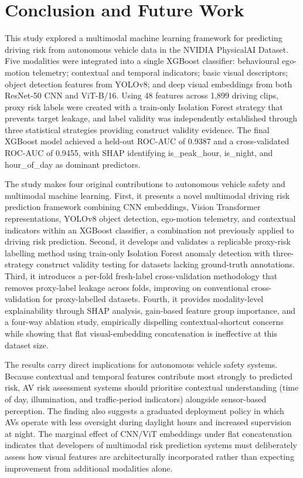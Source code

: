 \documentclass[11pt,a4paper]{article}
\begin{document}
\section{Conclusion and Future Work}

This study explored a multimodal machine learning framework for predicting driving risk from autonomous vehicle data in the NVIDIA PhysicalAI Dataset. Five modalities were integrated into a single XGBoost classifier: behavioural ego-motion telemetry; contextual and temporal indicators; basic visual descriptors; object detection features from YOLOv8; and deep visual embeddings from both ResNet-50 CNN and ViT-B/16. Using 48 features across 1,899 driving clips, proxy risk labels were created with a train-only Isolation Forest strategy that prevents target leakage, and label validity was independently established through three statistical strategies providing construct validity evidence. The final XGBoost model achieved a held-out ROC-AUC of 0.9387 and a cross-validated ROC-AUC of 0.9455, with SHAP identifying is\_peak\_hour, is\_night, and hour\_of\_day as dominant predictors.

The study makes four original contributions to autonomous vehicle safety and multimodal machine learning. First, it presents a novel multimodal driving risk prediction framework combining CNN embeddings, Vision Transformer representations, YOLOv8 object detection, ego-motion telemetry, and contextual indicators within an XGBoost classifier, a combination not previously applied to driving risk prediction. Second, it develops and validates a replicable proxy-risk labelling method using train-only Isolation Forest anomaly detection with three-strategy construct validity testing for datasets lacking ground-truth annotations. Third, it introduces a per-fold fresh-label cross-validation methodology that removes proxy-label leakage across folds, improving on conventional cross-validation for proxy-labelled datasets. Fourth, it provides modality-level explainability through SHAP analysis, gain-based feature group importance, and a four-way ablation study, empirically dispelling contextual-shortcut concerns while showing that flat visual-embedding concatenation is ineffective at this dataset size.

The results carry direct implications for autonomous vehicle safety systems. Because contextual and temporal features contribute most strongly to predicted risk, AV risk assessment systems should prioritise contextual understanding (time of day, illumination, and traffic-period indicators) alongside sensor-based perception. The finding also suggests a graduated deployment policy in which AVs operate with less oversight during daylight hours and increased supervision at night. The marginal effect of CNN/ViT embeddings under flat concatenation indicates that developers of multimodal risk prediction systems must deliberately assess how visual features are architecturally incorporated rather than expecting improvement from additional modalities alone.
\end{document}
